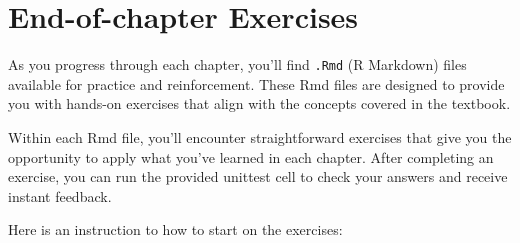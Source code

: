 \documentclass[
]{book}
\begin{document}
\hypertarget{end-of-chapter-exercises}{%
\section{End-of-chapter Exercises}\label{end-of-chapter-exercises}}

As you progress through each chapter, you'll find \texttt{.Rmd} (R Markdown) files available for practice and reinforcement. These Rmd files are designed to provide you with hands-on exercises that align with the concepts covered in the textbook.

Within each Rmd file, you'll encounter straightforward exercises that give you the opportunity to apply what you've learned in each chapter. After completing an exercise, you can run the provided unittest cell to check your answers and receive instant feedback.

Here is an instruction to how to start on the exercises:
\end{document}
